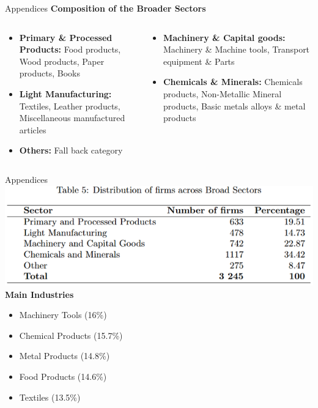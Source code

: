 \documentclass[
  xcolor=svgnames,
  bookmarks=true,
  bookmarksopen=true,
  pdfborder={0 0 0},
  pdfhighlight={/N},
  linkbordercolor={rgb}{0.5,0.5,0.5},
  implicit=false,
  colorlinks=true,
  allcolors=deepblue
]{beamer}
\begin{document}
\begin{frame}{Appendices}
\vspace{-1cm}
\textbf{Composition of the Broader Sectors}
\begin{columns}

  \begin{column}{0.48\textwidth}
    
    \begin{itemize}
      \item \textbf{Primary \& Processed Products:} Food products, Wood products, Paper products, Books
      \item \textbf{Light Manufacturing:} Textiles, Leather products, Miscellaneous manufactured articles
      \item \textbf{Others:} Fall back category
    \end{itemize}
  \end{column}

  \begin{column}{0.48\textwidth}
    
    \begin{itemize}
      \item \textbf{Machinery \& Capital goods:} Machinery \& Machine tools, Transport equipment \& Parts
      \item \textbf{Chemicals \& Minerals:} Chemicals products, Non-Metallic Mineral products, Basic metals alloys \& metal products
      
    \end{itemize}
  \end{column}

\end{columns}
\end{frame}

\begin{frame}{Appendices}
\centering
    \includegraphics[height = 3.5 cm]{Firms distribution sectors.png}
    \vspace{0.3cm}
    \textbf{Main Industries}
    \begin{itemize}
    \item Machinery Tools (16\%)
    \item Chemical Products (15.7\%)
    \item Metal Products (14.8\%)
    \item Food Products (14.6\%)
    \item Textiles (13.5\%)
    \end{itemize}
\end{frame}
\end{document}

